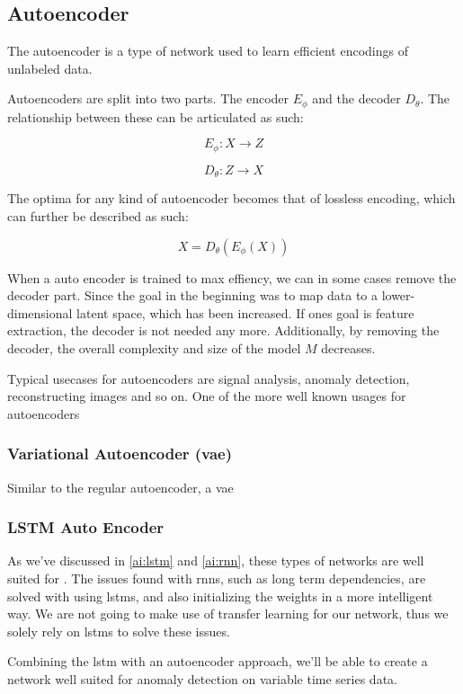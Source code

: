 \subsection{Autoencoder}

The autoencoder is a type of network used to learn efficient encodings of unlabeled data. 

Autoencoders are split into two parts. The encoder $E_\phi$ and the decoder $D_\theta$. The relationship between these can be articulated as such: 

\begin{equation}
E_\phi: X \rightarrow Z 
\end{equation}

\begin{equation}
D_\theta: Z \rightarrow X
\end{equation}

The optima for any kind of autoencoder becomes that of lossless encoding, which can further be described as such:

\begin{equation}
    X = D_\theta(E_\phi(X))
\end{equation}

When a auto encoder is trained to max effiency, we can in some cases remove the decoder part. Since the goal in the beginning was to map data to a lower-dimensional latent space, which has been increased. If ones goal is feature extraction, the decoder is not needed any more. Additionally, by removing the decoder, the overall complexity and size of the model $M$ decreases.


Typical usecases for autoencoders are signal analysis, anomaly detection, reconstructing images and so on. 
One of the more well known usages for autoencoders

\subsubsection{Variational Autoencoder (\acrshort{vae})}

Similar to the regular autoencoder, a \acrfull{vae}

\subsubsection{LSTM Auto Encoder}

As we've discussed in \ref{ai:lstm} and \ref{ai:rnn}, these types of networks are well suited for . The issues found with \acrshort{rnn}s, such as long term dependencies, are solved with using \acrshort{lstm}s, and also initializing the weights in a more intelligent way. We are not going to make use of transfer learning for our network, thus we solely rely on \acrshort{lstm}s to solve these issues.

Combining the \acrshort{lstm} with an autoencoder approach, we'll be able to create a network well suited for anomaly detection on variable time series data.
